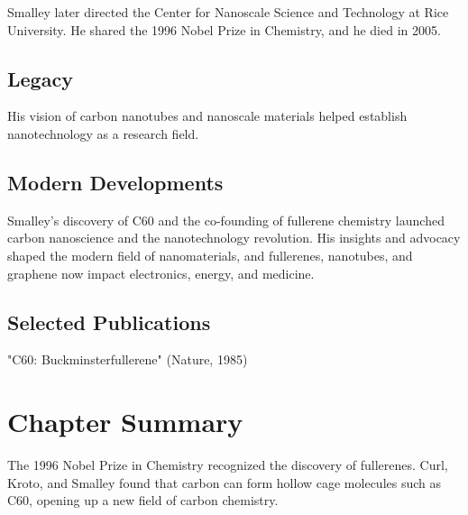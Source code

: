 Smalley later directed the Center for Nanoscale Science and Technology at Rice University. He shared the 1996 Nobel Prize in Chemistry, and he died in 2005.

\subsection*{Legacy}

His vision of carbon nanotubes and nanoscale materials helped establish nanotechnology as a research field.

\subsection*{Modern Developments}

Smalley's discovery of C60 and the co-founding of fullerene chemistry launched carbon nanoscience and the nanotechnology revolution. His insights and advocacy shaped the modern field of nanomaterials, and fullerenes, nanotubes, and graphene now impact electronics, energy, and medicine.

\subsection*{Selected Publications}

"C60: Buckminsterfullerene" (Nature, 1985)

\clearpage

\section*{Chapter Summary}

The 1996 Nobel Prize in Chemistry recognized the discovery of fullerenes. Curl, Kroto, and Smalley found that carbon can form hollow cage molecules such as C60, opening up a new field of carbon chemistry.
